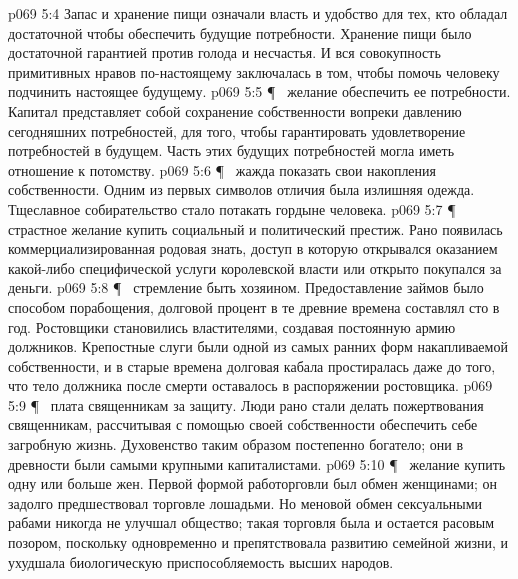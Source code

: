 \vs p069 5:4 \bibnobreakspace {} Запас и хранение пищи означали власть и удобство для тех, кто обладал достаточной  чтобы обеспечить будущие потребности. Хранение пищи было достаточной гарантией против голода и несчастья. И вся совокупность примитивных нравов по\hyp{}настоящему заключалась в том, чтобы помочь человеку подчинить настоящее будущему.
\vs p069 5:5 \P\ \bibnobreakspace {} желание обеспечить ее потребности. Капитал представляет собой сохранение собственности вопреки давлению сегодняшних потребностей, для того, чтобы гарантировать удовлетворение потребностей в будущем. Часть этих будущих потребностей могла иметь отношение к потомству.
\vs p069 5:6 \P\ \bibnobreakspace {} жажда показать свои накопления собственности. Одним из первых символов отличия была излишняя одежда. Тщеславное собирательство стало потакать гордыне человека.
\vs p069 5:7 \P\ \bibnobreakspace {} страстное желание купить социальный и политический престиж. Рано появилась коммерциализированная родовая знать, доступ в которую открывался оказанием какой\hyp{}либо специфической услуги королевской власти или открыто покупался за деньги.
\vs p069 5:8 \P\ \bibnobreakspace {} стремление быть хозяином. Предоставление займов было способом порабощения, долговой процент в те древние времена составлял сто в год. Ростовщики становились властителями, создавая постоянную армию должников. Крепостные слуги были одной из самых ранних форм накапливаемой собственности, и в старые времена долговая кабала простиралась даже до того, что тело должника после смерти оставалось в распоряжении ростовщика.
\vs p069 5:9 \P\ \bibnobreakspace {} плата священникам за защиту. Люди рано стали делать пожертвования священникам, рассчитывая с помощью своей собственности обеспечить себе загробную жизнь. Духовенство таким образом постепенно богатело; они в древности были самыми крупными капиталистами.
\vs p069 5:10 \P\ \bibnobreakspace {} желание купить одну или больше жен. Первой формой работорговли был обмен женщинами; он задолго предшествовал торговле лошадьми. Но меновой обмен сексуальными рабами никогда не улучшал общество; такая торговля была и остается расовым позором, поскольку одновременно и препятствовала развитию семейной жизни, и ухудшала биологическую приспособляемость высших народов.
